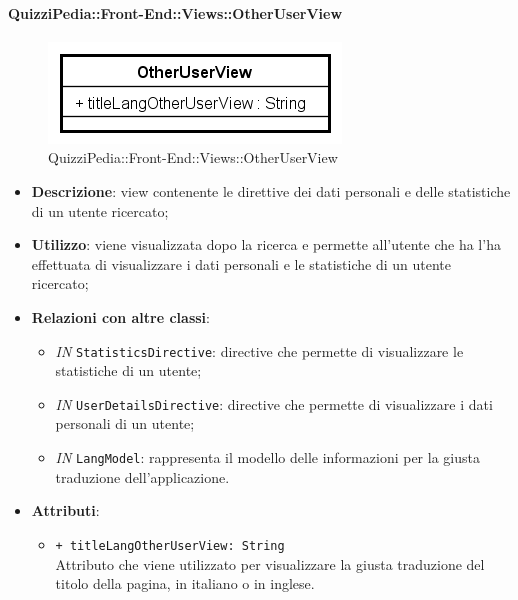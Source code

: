 \paragraph{QuizziPedia::Front-End::Views::OtherUserView}
\begin{figure} [ht]
	\centering
	\includegraphics[scale=0.80]{UML/Classi/Front-End/QuizziPedia_Front-end_Views_OtherUserView.png}
	\caption{QuizziPedia::Front-End::Views::OtherUserView}
\end{figure} \FloatBarrier
\begin{itemize}
	\item \textbf{Descrizione}: view contenente le direttive dei dati personali e delle statistiche di un utente ricercato;
	\item \textbf{Utilizzo}: viene visualizzata dopo la ricerca e permette all'utente che ha l'ha effettuata di visualizzare i dati personali e le statistiche di un utente ricercato;
	\item \textbf{Relazioni con altre classi}:
	\begin{itemize}
		\item \textit{IN} \texttt{StatisticsDirective}: directive che permette di visualizzare le statistiche di un utente;
		\item \textit{IN} \texttt{UserDetailsDirective}: directive che permette di visualizzare i dati personali di un utente;
		\item \textit{IN} \texttt{LangModel}: rappresenta il modello delle informazioni per la giusta traduzione dell'applicazione.
	\end{itemize}
	\item \textbf{Attributi}:
	\begin{itemize}
		\item \texttt{+ titleLangOtherUserView: String} \\ Attributo che viene utilizzato per visualizzare la giusta traduzione del titolo della pagina, in italiano o in inglese.
	\end{itemize}
\end{itemize}